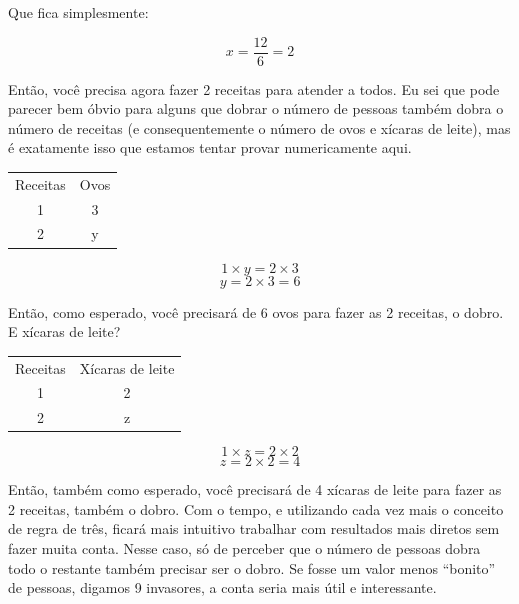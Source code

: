 \begin{exemplo}
    Que fica simplesmente:

    \begin{equation}
        x=\frac{12}{6}=2
    \end{equation}

    Então, você precisa agora fazer 2 receitas para atender a todos. Eu sei que pode parecer bem óbvio para alguns que dobrar o número de pessoas também dobra o número de receitas (e consequentemente o número de ovos e xícaras de leite), mas é exatamente isso que estamos tentar provar numericamente aqui.

    \begin{table}[H]
        \centering
        \begin{tabular}{cc}
            Receitas & Ovos \\
            1 & 3\\
            2 & y
        \end{tabular}

    \end{table}

    \begin{equation}
        1\times y = 2 \times 3
    \end{equation}
    \begin{equation}
        y=2\times3=6
    \end{equation}
    
    Então, como esperado, você precisará de 6 ovos para fazer as 2  receitas, o dobro. E xícaras de leite?
    
    \begin{table}[H]
        \centering
        \begin{tabular}{cc}
            Receitas & Xícaras de leite \\
            1 & 2\\
            2 & z
        \end{tabular}

    \end{table}
    
    \begin{equation}
        1\times z = 2\times 2
    \end{equation}
    \begin{equation}
        z=2\times2=4
    \end{equation}

    Então, também como esperado, você precisará de 4 xícaras de leite para fazer as 2 receitas, também o dobro. Com o tempo, e utilizando cada vez mais o conceito de regra de três, ficará mais intuitivo trabalhar com resultados mais diretos sem fazer muita conta. Nesse caso, só de perceber que o número de pessoas dobra todo o restante também precisar ser o dobro.
    Se fosse um valor menos ``bonito'' de pessoas, digamos 9 invasores, a conta seria mais útil e interessante. 
\end{exemplo}

